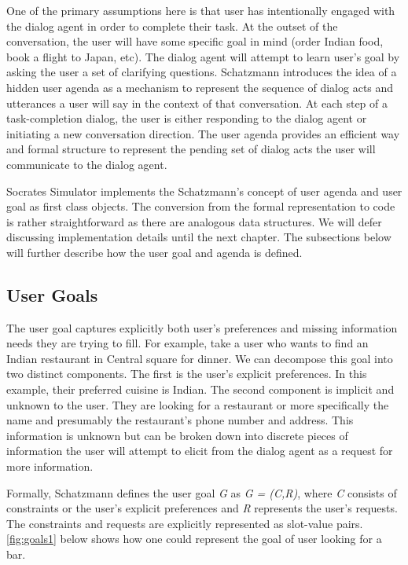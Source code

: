  One of the primary assumptions here is that user has intentionally engaged with the dialog agent in order to complete their task. At the outset of the conversation, the user will have some specific goal in mind (order Indian food, book a flight to Japan, etc). The dialog agent will attempt to learn user's goal by asking the user a set of clarifying questions. Schatzmann introduces the idea of a hidden user agenda as a mechanism to represent the sequence of dialog acts and utterances a user will say in the context of that conversation. At each step of a task-completion dialog, the user is either responding to the dialog agent or initiating a new conversation direction. The user agenda provides an efficient way and formal structure to represent the pending set of dialog acts the user will communicate to the dialog agent.
 
Socrates Simulator implements the Schatzmann's concept of user agenda and user goal as first class objects. The conversion from the formal representation to code is rather straightforward as there are analogous data structures. We will defer discussing implementation details until the next chapter. The subsections below will further describe how the user goal and agenda is defined. 

\subsection{User Goals} 
The user goal captures explicitly both user's preferences and missing information needs they are trying to fill. For example, take a user who wants to find an Indian restaurant in Central square for dinner. We can decompose this goal into two distinct components. The first is the user's explicit preferences. In this example, their preferred cuisine is Indian. The second component is implicit and unknown to the user. They are looking for a restaurant or more specifically the name and presumably the restaurant's phone number and address. This information is unknown but can be broken down into discrete pieces of information the user will attempt to elicit from the dialog agent as a request for more information. 

Formally, Schatzmann defines the user goal \textit{G} as \textit{G = (C,R)}, where \textit{C} consists of constraints or the user's explicit preferences and \textit{R} represents the user's requests. The constraints and requests are explicitly represented as slot-value pairs. \ref{fig:goals1} below shows how one could represent the goal of user looking for a bar. 

